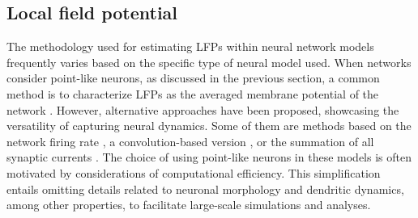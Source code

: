 \documentclass[../main.tex]{subfiles}
\begin{document}
\subsection{Local field potential}
The methodology used for estimating LFPs within neural network models frequently varies based on the specific type of neural model used.
When networks consider point-like neurons, as discussed in the previous section, a common method is to characterize LFPs as the averaged membrane potential of the network \citep{palmigiano_flexible_2017-1}.
However, alternative approaches have been proposed, showcasing the versatility of capturing neural dynamics.
Some of them are methods based on the network firing rate \citep{buehlmann_neuronal_2008}, a convolution-based version \citep{telenczuk_kernel-based_2020}, or the summation of all synaptic currents \citep{mazzoni_encoding_2008, negahbani_neuroimage_2018}.
The choice of using point-like neurons in these models is often motivated by considerations of computational efficiency. 
This simplification entails omitting details related to neuronal morphology and dendritic dynamics, among other properties, to facilitate large-scale simulations and analyses.
\end{document}
